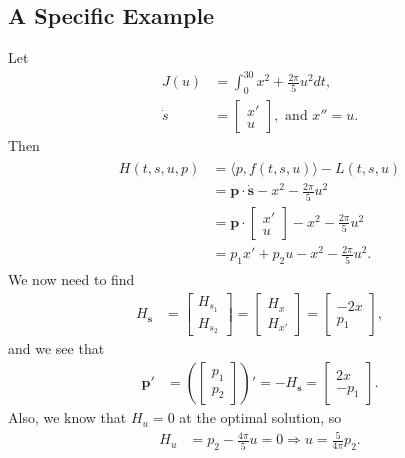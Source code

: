 \subsection*{A Specific Example}
Let 
\begin{align*}
	J(u) &= \int_0^{30} x^2 + \frac{2\pi}{5}u^2dt,\\
	\dot{s} &=  \begin{bmatrix}x'\\u \end{bmatrix}, \text{ and } x''=u.
\end{align*}
Then
\begin{align*}
	\begin{split}
	H(t,s,u,p) &= \langle p,f(t,s,u)\rangle - L(t,s,u)\\
	&= \boldsymbol{p} \cdot \dot{\boldsymbol{s}} - x^2 - \frac{2\pi}{5}u^2\\
	&= \boldsymbol{p} \cdot \begin{bmatrix}x'\\u \end{bmatrix} - x^2 - \frac{2\pi}{5}u^2\\
	&= p_1x' + p_2u - x^2 - \frac{2\pi}{5}u^2.
	\end{split}
\end{align*}
We now need to find
\begin{align*}
	H_{\boldsymbol{s}} &= \begin{bmatrix}H_{s_1}\\H_{s_2}\end{bmatrix} = \begin{bmatrix}H_{x}\\H_{x'}\end{bmatrix} = \begin{bmatrix}-2x\\p_1\end{bmatrix},
\end{align*}
and we see that
\begin{align*}
	\boldsymbol{p}' &= \left( \begin{bmatrix}p_1\\p_2\end{bmatrix} \right)'= -H_{\boldsymbol{s}} = \begin{bmatrix}2x\\-p_1\end{bmatrix}.
\end{align*}
Also, we know that $H_u=0$ at the optimal solution, so
\begin{align*}
	H_u &= p_2 - \frac{4\pi}{5}u=0 \Rightarrow u=\frac{5}{4\pi}p_2.
\end{align*}
